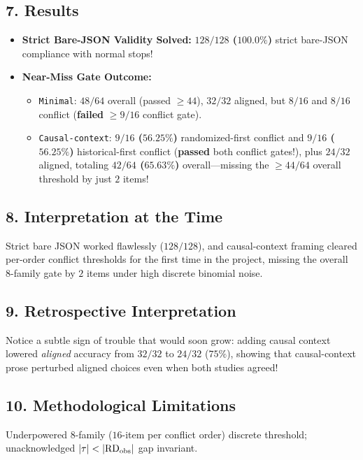 \subsection*{7. Results}
\begin{itemize}
  \item \textbf{Strict Bare-JSON Validity Solved:} \textbf{$128/128$ ($100.0\%$)} strict bare-JSON compliance with normal stops!
  \item \textbf{Near-Miss Gate Outcome:}
    \begin{itemize}
      \item \texttt{Minimal}: $48/64$ overall (passed $\ge 44$), $32/32$ aligned, but \textbf{$8/16$} and \textbf{$8/16$} conflict (\textbf{failed} $\ge 9/16$ conflict gate).
      \item \texttt{Causal-context}: \textbf{$9/16$ ($56.25\%$)} randomized-first conflict and \textbf{$9/16$ ($56.25\%$)} historical-first conflict (\textbf{passed} both conflict gates!), plus $24/32$ aligned, totaling \textbf{$42/64$ ($65.63\%$)} overall---missing the $\ge 44/64$ overall threshold by just $2$ items!
    \end{itemize}
\end{itemize}

\subsection*{8. Interpretation at the Time}
Strict bare JSON worked flawlessly ($128/128$), and causal-context framing cleared per-order conflict thresholds for the first time in the project, missing the overall 8-family gate by $2$ items under high discrete binomial noise.

\subsection*{9. Retrospective Interpretation}
Notice a subtle sign of trouble that would soon grow: adding causal context lowered \emph{aligned} accuracy from $32/32$ to $24/32$ ($75\%$), showing that causal-context prose perturbed aligned choices even when both studies agreed!

\subsection*{10. Methodological Limitations}
Underpowered $8$-family ($16$-item per conflict order) discrete threshold; unacknowledged $|\tau| < |\mathrm{RD}_{\mathrm{obs}}|$ gap invariant.


